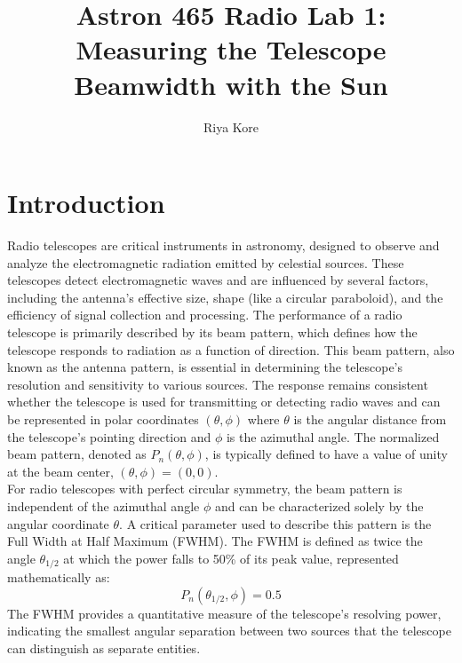 \documentclass[linenumbers,twocolumn]{aastex631}
\begin{document}
\title{Astron 465 Radio Lab 1: Measuring the Telescope Beamwidth with the Sun}



\author[0000-0002-3418-7817]{Riya Kore}

\section{Introduction}
Radio telescopes are critical instruments in astronomy, designed to observe and analyze the electromagnetic radiation emitted by celestial sources. These telescopes detect electromagnetic waves and are influenced by several factors, including the antenna's effective size, shape (like a circular paraboloid), and the efficiency of signal collection and processing. The performance of a radio telescope is primarily described by its beam pattern, which defines how the telescope responds to radiation as a function of direction. This beam pattern, also known as the antenna pattern, is essential in determining the telescope’s resolution and sensitivity to various sources. The response remains consistent whether the telescope is used for transmitting or detecting radio waves and can be represented in polar coordinates $(\theta , \phi)$ where $\theta$ is the angular distance from the telescope’s pointing direction and $\phi$ is the azimuthal angle. The normalized beam pattern, denoted as $P_{n}(\theta, \phi)$, is typically defined to have a value of unity at the beam center, $(\theta, \phi) = (0,0)$. \\
For radio telescopes with perfect circular symmetry, the beam pattern is independent of the azimuthal angle \(\phi\) and can be characterized solely by the angular coordinate \(\theta\). A critical parameter used to describe this pattern is the Full Width at Half Maximum (FWHM). The FWHM is defined as twice the angle \(\theta_{1/2}\) at which the power falls to 50\% of its peak value, represented mathematically as:
\[
P_n(\theta_{1/2}, \phi) = 0.5
\]
The FWHM provides a quantitative measure of the telescope’s resolving power, indicating the smallest angular separation between two sources that the telescope can distinguish as separate entities.
\end{document}
